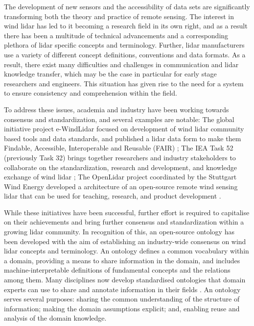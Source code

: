 \documentclass[remotesensing,article,submit,pdftex,moreauthors]{Definitions/mdpi}
\begin{document}
The development of new sensors and the accessibility of data sets are significantly transforming both the theory and practice of remote sensing.
The interest in wind lidar has led to it becoming a research field in its own right, and as a result there has been a multitude of technical advancements and a corresponding plethora of lidar specific concepts and terminology. 
Further, lidar manufacturers use a variety of different concept definitions, conventions and data formats.
As a result, there exist many difficulties and challenges in communication and lidar knowledge transfer, which may be the case in particular for early stage researchers and engineers. This situation has given rise to the need for a system to ensure consistency and comprehension within the field.

To address these issues, academia and industry have been working towards consensus and standardization, and several examples are notable:
The global initiative project e-WindLidar focused on development of wind lidar community based tools and data standards, and published a lidar data form to make them Findable, Accessible, Interoperable and Reusable (FAIR) \cite{ref-Vasiljevi}; 
The IEA Task 52 (previously Task 32) brings together researchers and industry stakeholders to collaborate on the standardization, research and development, and knowledge exchange of wind lidar \cite{ref-Clifton-Schlipf};
The OpenLidar project coordinated by the Stuttgart Wind Energy developed a architecture of an open-source remote wind sensing lidar that can be used for teaching, research, and product development \cite{ref-SWE}.

While these initiatives have been successful, further effort is required to capitalise on their achievements and bring further consensus and standardization within a growing lidar community.
In recognition of this, an open-source ontology has been developed with the aim of establishing an industry-wide consensus on wind lidar concepts and terminology.
An ontology defines a common vocabulary within a domain, providing a means to share information in the domain, and includes machine-interpretable definitions of fundamental concepts and the relations among them.
Many disciplines now develop standardised ontologies that domain experts can use to share and annotate information in their fields \cite{ref-Noy}.
An ontology serves several purposes: sharing the common understanding of the structure of information; making the domain assumptions explicit; and, enabling reuse and analysis of the domain knowledge.
\end{document}
